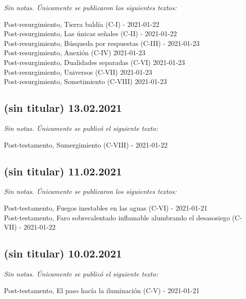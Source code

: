 \documentclass[
]{book}
\begin{document}
\emph{Sin notas. Únicamente se publicaron los siguientes textos:}

Post-resurgimiento, Tierra baldía (C-I) - 2021-01-22~\\
Post-resurgimiento, Las únicas señales (C-II) - 2021-01-22~\\
Post-resurgimiento, Búsqueda por respuestas (C-III) - 2021-01-23~\\
Post-resurgimiento, Anexión (C-IV) 2021-01-23~\\
Post-resurgimiento, Dualidades separadas (C-VI) 2021-01-23~\\
Post-resurgimiento, Universos (C-VII) 2021-01-23~\\
Post-resurgimiento, Sometimiento (C-VIII) 2021-01-23

\hypertarget{sin-titular-13.02.2021}{%
\subsection*{(sin titular) 13.02.2021}\label{sin-titular-13.02.2021}}

\emph{Sin notas. Únicamente se publicó el siguiente texto:}

Post-testamento, Sumergimiento (C-VIII) - 2021-01-22

\hypertarget{sin-titular-11.02.2021}{%
\subsection*{(sin titular) 11.02.2021}\label{sin-titular-11.02.2021}}

\emph{Sin notas. Únicamente se publicaron los siguientes textos:}

Post-testamento, Fuegos inestables en las aguas (C-VI) - 2021-01-21~\\
Post-testamento, Faro sobrecalentado inflamable alumbrando el desasosiego (C-VII) - 2021-01-22

\hypertarget{sin-titular-10.02.2021}{%
\subsection*{(sin titular) 10.02.2021}\label{sin-titular-10.02.2021}}

\emph{Sin notas. Únicamente se publicó el siguiente texto:}

Post-testamento, El paso hacía la iluminación (C-V) - 2021-01-21
\end{document}
